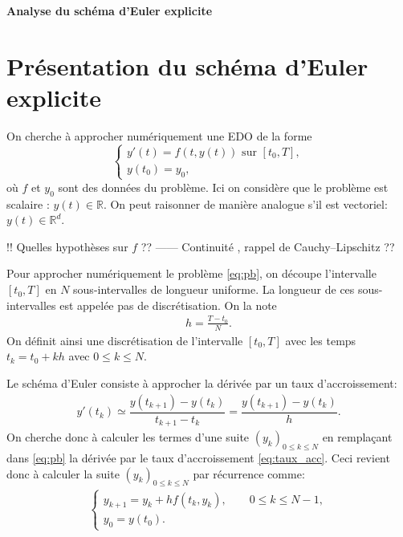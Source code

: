 \documentclass[12pt,a4paper,twoside]{article}
\begin{document}
\newtheorem{theorem}{Th\'eor\`eme}
\newtheorem{proposition}{Proposition}
\newtheorem{definition}{D\'efinition}
\newcommand*{\R}{\mathbb{R}}
\newcommand*{\N}{\mathbb{N}}

\begin{center}
{\bf \Huge Analyse du sch\'ema d'Euler explicite}
\end{center}


\section{Pr\'esentation du sch\'ema d'Euler explicite}

On cherche \`a approcher num\'eriquement une EDO de la forme
\begin{equation}
  \label{eq:pb}
  \left\{
    \begin{array}{l}
      y'(t) = f(t,y(t)) \text{ sur } [t_0,T] ,
      \\
      y(t_0) = y_0 ,
    \end{array}
  \right.
\end{equation}
o\`u $f$ et $y_0$ sont des donn\'ees du probl\`eme.
Ici on consid\`ere que le probl\`eme est scalaire : $y(t) \in \R$.
On peut raisonner de mani\`ere analogue s'il est vectoriel:
$y(t) \in \R^d$.


!! Quelles hypoth\`eses sur $f$ ??
------ Continuit\'e , rappel de Cauchy--Lipschitz ??


Pour approcher num\'eriquement le probl\`eme \eqref{eq:pb}, on d\'ecoupe l'intervalle
$[t_0,T]$ en $N$ sous-intervalles de longueur uniforme.
La longueur de ces sous-intervalles est appel\'ee pas de discr\'etisation.
On la note
\begin{align*}
  h = \frac{T - t_0}{N} .
\end{align*}
On d\'efinit ainsi une discr\'etisation 
de l'intervalle $[t_0,T]$ avec les temps $t_k = t_0 + kh$ avec $0 \leq k \leq N$.


Le sch\'ema d'Euler consiste \`a approcher la d\'eriv\'ee par un taux d'accroissement:
\begin{align}
  \label{eq:taux_acc}
  y'(t_k) \simeq \dfrac{y(t_{k+1}) - y(t_k)}{t_{k+1} - t_k } = \dfrac{y(t_{k+1}) - y(t_k)}{h} .
\end{align}
On cherche donc \`a calculer les termes d'une suite $(y_k)_{0 \leq k \leq N}$
en rempla\c{c}ant dans \eqref{eq:pb} la d\'eriv\'ee par le taux d'accroissement
\eqref{eq:taux_acc}.
Ceci revient donc \`a calculer la suite $(y_k)_{0 \leq k \leq N}$ par r\'ecurrence comme:
\begin{align*}
  \left\{
  \begin{array}{l}
    y_{k+1} = y_k + h f(t_k , y_k), \qquad 0 \leq k \leq N-1 ,
    \\
    y_0 = y(t_0) .
  \end{array}
  \right.
\end{align*}
\end{document}
